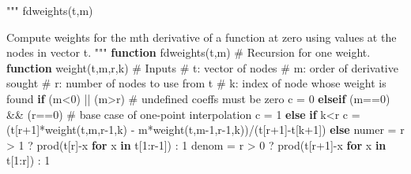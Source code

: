 \documentclass[
]{article}
\newenvironment{Shaded}{\begin{snugshade}}{\end{snugshade}}
\newcommand{\CommentTok}[1]{\textcolor[rgb]{0.37,0.37,0.37}{#1}}
\newcommand{\ControlFlowTok}[1]{\textcolor[rgb]{0.00,0.23,0.31}{\textbf{#1}}}
\newcommand{\FloatTok}[1]{\textcolor[rgb]{0.68,0.00,0.00}{#1}}
\newcommand{\FunctionTok}[1]{\textcolor[rgb]{0.28,0.35,0.67}{#1}}
\newcommand{\KeywordTok}[1]{\textcolor[rgb]{0.00,0.23,0.31}{\textbf{#1}}}
\newcommand{\NormalTok}[1]{\textcolor[rgb]{0.00,0.23,0.31}{#1}}
\newcommand{\OperatorTok}[1]{\textcolor[rgb]{0.37,0.37,0.37}{#1}}
\newcommand{\StringTok}[1]{\textcolor[rgb]{0.13,0.47,0.30}{#1}}
\begin{document}
\begin{Shaded}
\begin{Highlighting}[]
\StringTok{"""}
\StringTok{    fdweights(t,m)}

\StringTok{Compute weights for the \textasciigrave{}m\textasciigrave{}th derivative of a function at zero using values at the nodes in vector \textasciigrave{}t\textasciigrave{}.}
\StringTok{"""}
\KeywordTok{function} \FunctionTok{fdweights}\NormalTok{(t,m)}
    \CommentTok{\# Recursion for one weight.}
    \KeywordTok{function} \FunctionTok{weight}\NormalTok{(t,m,r,k)}
        \CommentTok{\# Inputs}
        \CommentTok{\#   t: vector of nodes}
        \CommentTok{\#   m: order of derivative sought}
        \CommentTok{\#   r: number of nodes to use from t}
        \CommentTok{\#   k: index of node whose weight is found}
        \ControlFlowTok{if}\NormalTok{ (m}\OperatorTok{\textless{}}\FloatTok{0}\NormalTok{) }\OperatorTok{||}\NormalTok{ (m}\OperatorTok{\textgreater{}}\NormalTok{r)        }\CommentTok{\# undefined coeffs must be zero}
\NormalTok{            c }\OperatorTok{=} \FloatTok{0}
        \ControlFlowTok{elseif}\NormalTok{ (m}\OperatorTok{==}\FloatTok{0}\NormalTok{) }\OperatorTok{\&\&}\NormalTok{ (r}\OperatorTok{==}\FloatTok{0}\NormalTok{)  }\CommentTok{\# base case of one{-}point interpolation}
\NormalTok{            c }\OperatorTok{=} \FloatTok{1}
        \ControlFlowTok{else}
            \ControlFlowTok{if}\NormalTok{ k}\OperatorTok{\textless{}}\NormalTok{r}
\NormalTok{                c }\OperatorTok{=}\NormalTok{ (t[r}\OperatorTok{+}\FloatTok{1}\NormalTok{]}\FunctionTok{*weight}\NormalTok{(t,m,r}\OperatorTok{{-}}\FloatTok{1}\NormalTok{,k) }\OperatorTok{{-}} \FunctionTok{m*weight}\NormalTok{(t,m}\OperatorTok{{-}}\FloatTok{1}\NormalTok{,r}\OperatorTok{{-}}\FloatTok{1}\NormalTok{,k))}\OperatorTok{/}\NormalTok{(t[r}\OperatorTok{+}\FloatTok{1}\NormalTok{]}\OperatorTok{{-}}\NormalTok{t[k}\OperatorTok{+}\FloatTok{1}\NormalTok{])}
            \ControlFlowTok{else}
\NormalTok{                numer }\OperatorTok{=}\NormalTok{ r }\OperatorTok{\textgreater{}} \FloatTok{1}\NormalTok{ ? }\FunctionTok{prod}\NormalTok{(t[r]}\OperatorTok{{-}}\NormalTok{x }\ControlFlowTok{for}\NormalTok{ x }\KeywordTok{in}\NormalTok{ t[}\FloatTok{1}\OperatorTok{:}\NormalTok{r}\OperatorTok{{-}}\FloatTok{1}\NormalTok{]) }\OperatorTok{:} \FloatTok{1}
\NormalTok{                denom }\OperatorTok{=}\NormalTok{ r }\OperatorTok{\textgreater{}} \FloatTok{0}\NormalTok{ ? }\FunctionTok{prod}\NormalTok{(t[r}\OperatorTok{+}\FloatTok{1}\NormalTok{]}\OperatorTok{{-}}\NormalTok{x }\ControlFlowTok{for}\NormalTok{ x }\KeywordTok{in}\NormalTok{ t[}\FloatTok{1}\OperatorTok{:}\NormalTok{r]) }\OperatorTok{:} \FloatTok{1}

\end{Highlighting}
\end{Shaded}
\end{document}
